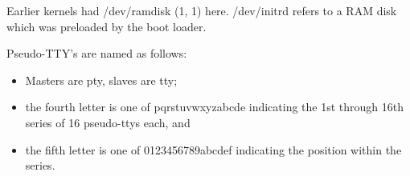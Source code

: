 \noindent
Earlier kernels had {\file /dev/ramdisk} (1, 1) here.  {\file /dev/initrd}
refers to a RAM disk which was preloaded by the boot loader.

\begin{devicelist}
	\minordots
\end{devicelist}

\noindent
Pseudo-TTY's are named as follows:
\begin{itemize}
\item Masters are {\file pty}, slaves are {\file tty};
\item the fourth letter is one of {\file pqrstuvwxyzabcde} indicating
the 1st through 16th series of 16 pseudo-ttys each, and
\item the fifth letter is one of {\file 0123456789abcdef} indicating
the position within the series.
\end{itemize}

